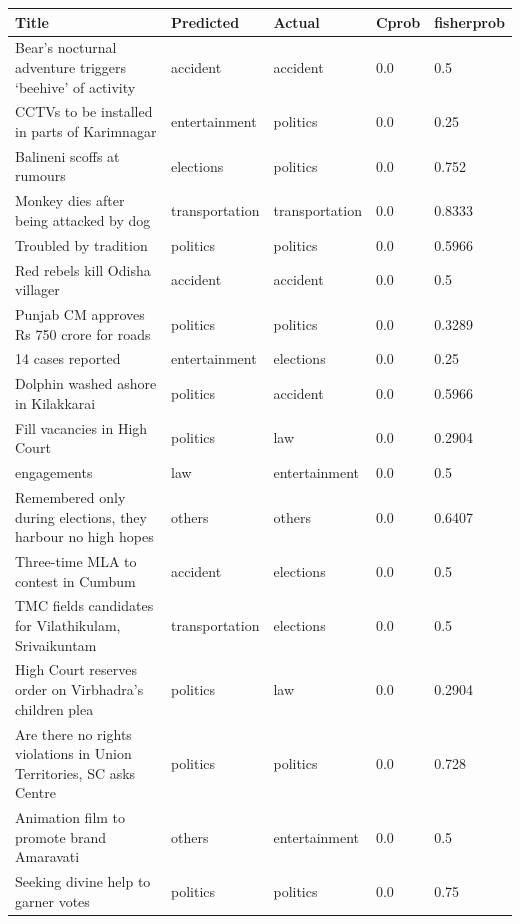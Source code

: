 \begin{table}
\small
\begin{tabular}{ | p{5.4cm} | p{2.0cm} | p{2.0cm}|p{1.3cm}|p{1.5cm}|}
\hline
\textbf{Title} & \textbf{Predicted} & \textbf{Actual}& \textbf{Cprob} & \textbf{fisherprob} \\
\hline
Bear’s nocturnal adventure triggers ‘beehive’ of activity & accident  & accident & 0.0 & 0.5 \\
\hline
CCTVs to be installed in parts of Karimnagar  & entertainment  & politics & 0.0 & 0.25 \\
\hline
Balineni scoffs at rumours & elections  & politics & 0.0 & 0.752 \\
\hline
Monkey dies after being attacked by dog & transportation  & transportation & 0.0 & 0.8333 \\
\hline
Troubled by tradition &  politics  & politics & 0.0 & 0.5966 \\
\hline
Red rebels kill Odisha villager & accident  & accident & 0.0 & 0.5 \\
\hline
Punjab CM approves Rs 750 crore for roads & politics  & politics & 0.0 & 0.3289 \\
\hline
14 cases reported & entertainment  & elections & 0.0 & 0.25 \\
\hline
Dolphin washed ashore in Kilakkarai &  politics  & accident & 0.0 & 0.5966 \\
\hline
Fill vacancies in High Court & politics  & law & 0.0 & 0.2904 \\
\hline
engagements & law  & entertainment & 0.0 & 0.5 \\
\hline
Remembered only during elections, they harbour no high hopes & others  & others & 0.0 & 0.6407 \\
\hline
Three-time MLA to contest in Cumbum & accident  & elections & 0.0 & 0.5 \\
\hline
TMC fields candidates for Vilathikulam, Srivaikuntam & transportation  & elections & 0.0 & 0.5 \\
\hline
High Court reserves order on Virbhadra’s children plea & politics  & law & 0.0 & 0.2904 \\
\hline
Are there no rights violations in Union Territories, SC asks Centre & politics  & politics & 0.0 & 0.728 \\
\hline
Animation film to promote brand Amaravati & others  & entertainment & 0.0 & 0.5 \\
\hline
Seeking divine help to garner votes & politics  & politics & 0.0 & 0.75 \\

\end{tabular}
\end{table}
